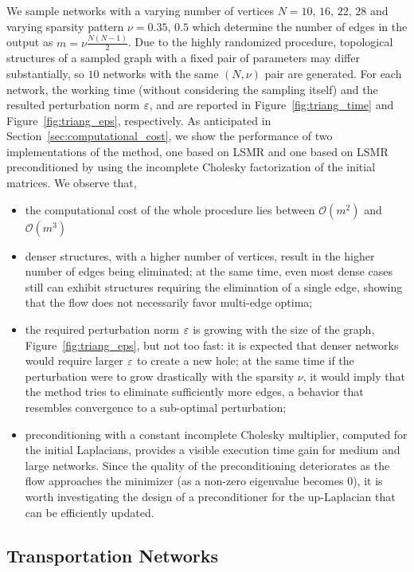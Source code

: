 We sample networks with a varying number of vertices $N=10, \, 16, \, 22, \, 28$ and varying sparsity pattern $\nu=0.35, \, 0.5$ which determine the number of edges in the output  as $m = \nu \frac{N(N-1)}{2}$. Due to the highly randomized procedure, topological structures of a sampled graph with a fixed pair of parameters may differ substantially, so $10$ networks with the same $(N, \nu)$ pair are generated. For each network, the working time  (without considering the sampling itself) and the resulted perturbation norm $\varepsilon$, and are reported in  Figure~\ref{fig:triang_time} and Figure~\ref{fig:triang_eps}, respectively. As anticipated in  Section~\ref{sec:computational_cost}, we show the performance of two implementations of the method, one based on LSMR and one based on LSMR preconditioned by using  the  incomplete Cholesky factorization of the initial matrices. We observe that, 
\begin{itemize}
    \item  the computational cost of the whole procedure  lies between $\mathcal O(m^2)$ and $\mathcal O(m^3)$ 
    \item denser structures, with a higher number of vertices, result in the higher number of edges being eliminated; at the same time, even most dense cases still can exhibit structures requiring the elimination of a single edge, showing that  the flow does not necessarily favor multi-edge optima;
    \item the required perturbation norm $\varepsilon$ is growing with the size of the graph, Figure~\ref{fig:triang_eps}, but not too fast: it is expected that denser networks would require larger $\varepsilon$ to create a new hole; at the same time if the perturbation were to grow drastically with the sparsity $\nu$, it would imply that the method tries to eliminate sufficiently more edges, a behavior that resembles convergence to a sub-optimal perturbation;
    \item preconditioning with a constant incomplete Cholesky multiplier, computed for the initial Laplacians, 
    provides a visible execution time gain for medium and large networks. Since the quality of the preconditioning deteriorates as the flow approaches the minimizer (as a non-zero eigenvalue becomes $0$), it is worth investigating the design of a preconditioner for the up-Laplacian that can be efficiently updated.
\end{itemize}


\subsection{Transportation Networks}


